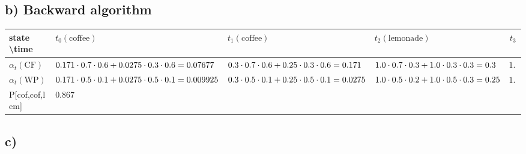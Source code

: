\documentclass[a4paper]{article}
\begin{document}
\subsection*{b) Backward algorithm}
\begin{tabular}{| p{3cm} | p{3cm} | p{3cm} | p{3cm} | c|}
  \hline
  state \textbackslash time & $t_0(\text{coffee})$ & $t_1(\text{coffee})$ & $t_2(\text{lemonade})$ & $t_3$\\ \hline
  $\alpha_t(\text{CF})$ 	& $0.171 \cdot 0.7 \cdot 0.6 \newline + 0.0275 \cdot 0.3 \cdot 0.6 \newline = 0.07677 $ 	& $0.3 \cdot 0.7 \cdot 0.6 \newline + 0.25 \cdot 0.3 \cdot 0.6 \newline = 0.171$ 	& $1.0 \cdot 0.7 \cdot 0.3 \newline + 1.0 \cdot 0.3 \cdot 0.3 \newline = 0.3$ 	& $1.0$		\\ \hline
  $\alpha_t(\text{WP})$ 	& $0.171 \cdot 0.5 \cdot 0.1 \newline + 0.0275 \cdot 0.5 \cdot 0.1 \newline = 0.009925$ 	& $0.3 \cdot 0.5 \cdot 0.1 \newline + 0.25 \cdot 0.5 \cdot 0.1 \newline = 0.0275$ 	& $1.0 \cdot 0.5 \cdot 0.2 \newline + 1.0 \cdot 0.5 \cdot 0.3 \newline = 0.25$ 		& $1.0$ 	\\ \hline
  P[cof,cof,lem] & $0.867$ &	&  &  \\ \hline
\end{tabular}

\subsection*{c)}
\end{document}
